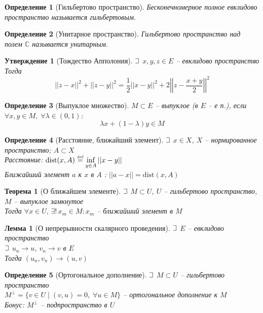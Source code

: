 \documentclass{article}
\theoremstyle{truestyle}
\newtheorem*{defenition}{Определение}
\newtheorem*{theorem}{Теорема}
\newtheorem*{lemma}{Лемма}
\newtheorem*{utv}{Утверждение}
\newcommand{\dist}{\text{dist}}
\newcommand{\eqdef}{\overset{\text{\tiny def}}=}
\def\letus{%
	\mathord{\setbox0=\hbox{$\exists$}%
		\hbox{\kern 0.125\wd0%
			\vbox to \ht0{%
				\hrule width 0.75\wd0%
				\vfill%
				\hrule width 0.75\wd0}%
			\vrule height \ht0%
			\kern 0.125\wd0}%
	}%
}
\begin{document}
\begin{defenition}[Гильбертово пространство]
  Бесконечномерное полное евклидово пространство называется гильбертовым.
\end{defenition}

\begin{defenition}[Унитарное пространство]
  Гильбертово пространство над полем $\mathbb{C}$ называется унитарным.
\end{defenition}

\begin{utv}[Тождество Апполония]
  $\letus$ $x, y, z \in E$ -- евклидово пространство\\
  Тогда $$||z - x||^2 + ||z - y||^2 = \frac{1}{2} ||x - y||^2  + 2 \left|\left|z - \frac{x+y}{2}\right|\right|^2$$
\end{utv}

\begin{defenition}[Выпуклое множество]
  $M \subset E$ -- выпуклое (в $E$ -- е п.),
  если $\forall x, y \in M, \; \forall \lambda \in (0, 1)$: $$\lambda x + (1-\lambda)y \in M$$
\end{defenition}

\begin{defenition}[Расстояние, ближайший элемент]
  $\letus$ $x \in X$, $X$ -- нормированное пространство; $A \subset X$\\
  Расстояние: $\dist(x, A) \eqdef  \inf\limits_{y\in A}||x - y||$\\
  Ближайший элемент $a$ к $x$ в $A$ : $||a - x|| = \dist(x, A)$
\end{defenition}

\begin{theorem}[О ближайшем элементе]
  $\letus$ $M \subset U$, $U$ -- гильбертово пространство, $M$ -- выпуклое замкнутое\\
  Тогда $\forall x \in U, \, \exists! \, x_m \in M: x_m$ -- ближайший элемент в $M$
\end{theorem}

\begin{lemma}[О непрерывности скалярного проведения]
  $\letus$ $E$ -- евклидово пространство\\
  $\letus$ $u_n \longrightarrow u$, $v_n \longrightarrow v$ в $E$\\
  Тогда $(u_n, v_n) \longrightarrow (u, v)$
\end{lemma}

\begin{defenition}[Ортогональное дополнение]
  $\letus$ $M \subset U$ -- гильбертово пространство\\
  $M^{\perp} = \{v \in U \mid (v, u) = 0, \; \forall u \in M \}$ -- ортогональное дополнение к $M$\\
  Бонус: $M^{\perp}$ -- подпространство в $U$
\end{defenition}
\end{document}
